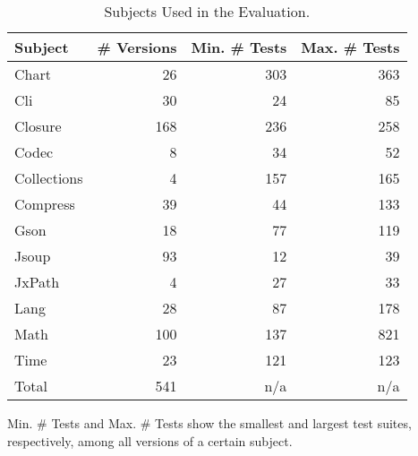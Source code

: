 \begin{table}[!t]
  \centering
  \begin{tabular}{lrrr}
    \toprule
    Subject & \# Versions & Min. \# Tests & Max. \# Tests \\
    \midrule
    Chart & 26 & 303 & 363 \\
    Cli & 30 & 24 & 85 \\
    Closure & 168 & 236 & 258 \\
    Codec & 8 & 34 & 52 \\
    Collections & 4 & 157 & 165 \\
    Compress & 39 & 44 & 133 \\
    Gson & 18 & 77 & 119 \\
    Jsoup & 93 & 12 & 39 \\
    JxPath & 4 & 27 & 33 \\
    Lang & 28 & 87 & 178 \\
    Math & 100 & 137 & 821 \\
    Time & 23 & 121 & 123 \\
    \midrule
    Total & 541 & n/a & n/a\\
    \bottomrule
  \end{tabular}
  \begin{flushleft}
  \footnotesize
  Min. \# Tests and Max. \# Tests show the smallest and largest test suites, respectively, among all versions of a certain subject.
  \end{flushleft}
  \caption{Subjects Used in the Evaluation.}
  \label{tab:projects}
\end{table}

%

